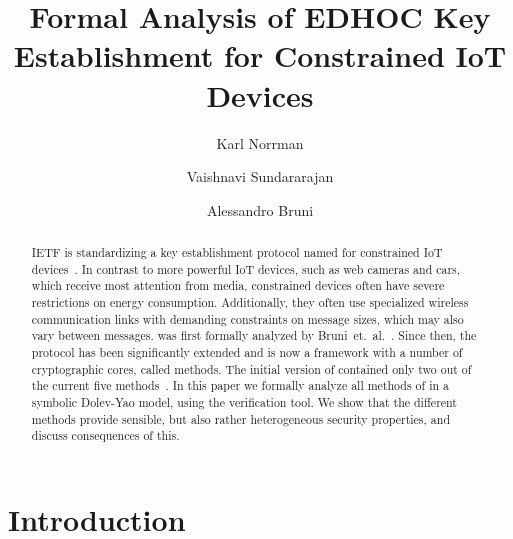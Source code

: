 \documentclass[runningheads,draft,x11names]{llncs}
\begin{document}
\title{Formal Analysis of EDHOC Key Establishment for Constrained IoT Devices}
\author{Karl Norrman \and
Vaishnavi Sundararajan \and
Alessandro Bruni
}
%
%
%
\maketitle
%

\begin{abstract}
    IETF is standardizing a key establishment protocol named \mEdhoc{} for
constrained IoT devices~\cite{selander-lake-edhoc-01}.
%
In contrast to more powerful IoT devices, such as web cameras and cars,
which receive most attention from media, constrained devices often have severe
restrictions on energy consumption.
%
Additionally, they often use specialized wireless communication links with
demanding constraints on message sizes, which may also vary between messages.
%
\mEdhoc{} was first formally analyzed by
Bruni~et.~al.~\cite{DBLP:conf/secsr/BruniJPS18}.
%
Since then, the protocol has been significantly extended and is now a
framework with a number of cryptographic cores, called methods.
%
The initial version of \mEdhoc{} contained only two out of the current five
methods~\cite{selander-ace-cose-ecdhe-08}.
%
In this paper we formally analyze all methods of \mEdhoc{} in a symbolic
Dolev-Yao model, using the \mTamarin{} verification tool.
%
We show that the different methods provide sensible, but also rather
heterogeneous security properties, and discuss consequences of this.
%
\end{abstract}
%

\section{Introduction}
\label{sec:introduction}
\end{document}
